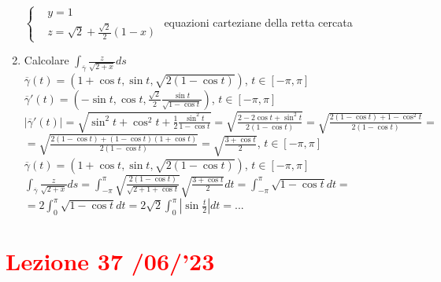 \documentclass{article}
\begin{document}
\begin{enumerate}
    $\begin{cases}
        & y=1\\
        & z= \sqrt{2} +\frac{\sqrt{2}}{2}(1-x)
    \end{cases}$
    equazioni carteziane della retta cercata
    \item Calcolare $\int_{\overline{\gamma}} \frac{z}{\sqrt{2+x}}ds$\\
    $\overline{\gamma}(t)=\left( 1+\cos t, \sin t, \sqrt{2(1-\cos t)} \right)$, $t \in [-\pi,\pi]$\\
    $\overline{\gamma}'(t)=\left( -\sin t , \cos t , \frac{\sqrt{2}}{2}\frac{\sin t }{\sqrt{1-\cos t}}\right)$, $t \in [-\pi,\pi]$\\
    $|\overline{\gamma}'(t)|=\sqrt{\sin^2t+\cos^2t+\frac{1}{2}\frac{\sin^2 t}{1-\cos t}}=\sqrt{\frac{2-2\cos t + \sin^2 t}{2(1-\cos t)}}=\sqrt{\frac{2(1-\cos t)+1-\cos^2t}{2(1-\cos t)}}=$\\$=\sqrt{\frac{2(1-\cos t)+ (1-\cos t)(1+\cos t)}{2(1-\cos t)}}=\sqrt{\frac{3+\cos t}{2}}$, $ t \in [-\pi,\pi]$\\
    $\overline{\gamma}(t)=\left(1+\cos t, \sin t , \sqrt{2(1-\cos t)}\right)$, $t \in [-\pi,\pi]$\\
    $\int_{\overline{\gamma}} \frac{z}{\sqrt{2+x}}ds=\int_{-\pi}^\pi \sqrt{\frac{2(1-\cos t)}{\sqrt{2+1+\cos t}}}\sqrt{\frac{3+\cos t}{2}}dt= \int_{-\pi}^\pi \sqrt{1-\cos t}dt=$\\
    $=2 \int_0^\pi \sqrt{1-\cos t}dt= 2 \sqrt{2}\int_0^\pi|\sin \frac{t}{2}|dt=...$
\end{enumerate}

\newpage
\section{\textcolor{red}{Lezione 37 \space{}/06/'23}}
\end{document}
